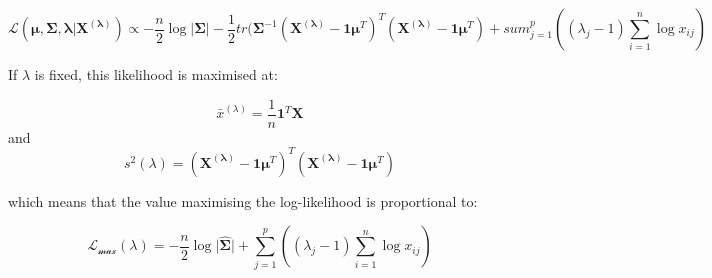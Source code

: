 
\begin{equation}
\mathscr{L}(\boldsymbol{\mu, \Sigma, \lambda} | \boldsymbol{X^{(\lambda)}}) \propto -\frac{n}{2} \log \lvert \boldsymbol{\Sigma} \rvert - 
\frac{1}{2} tr (\boldsymbol{\Sigma}^{-1} 
(\boldsymbol{X}^{(\boldsymbol{\lambda})} - \boldsymbol{1}\boldsymbol{\mu}^{T})^{T}
(\boldsymbol{X}^{(\boldsymbol{\lambda})} - \boldsymbol{1}\boldsymbol{\mu}^{T})
+ sum_{j=1}^{p} \left( (\lambda_{j} - 1) \sum_{i=1}^{n} \log x_{ij} \right)
\end{equation}


If $\lambda$ is fixed, this likelihood is maximised at:

\begin{equation}
\bar{x}^{(\lambda)} = \frac{1}{n}  \boldsymbol{1}^{T} \boldsymbol{X}
\end{equation}
and 
\begin{equation}
s^{2}(\lambda) = (\boldsymbol{X}^{(\boldsymbol{\lambda})} - \boldsymbol{1}\boldsymbol{\mu}^{T})^{T}
(\boldsymbol{X}^{(\boldsymbol{\lambda})} - \boldsymbol{1}\boldsymbol{\mu}^{T})
\end{equation}

which means that the value maximising the log-likelihood is proportional to:

\begin{equation}
\mathscr{L_{max}}(\lambda) = -\frac{n}{2} \log \lvert \hat{\boldsymbol{\Sigma}} \rvert + \sum_{j=1}^{p} \left( (\lambda_{j} - 1) \sum_{i=1}^{n} \log x_{ij} \right)
\end{equation}
